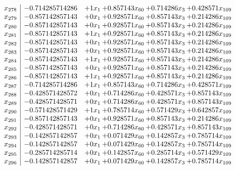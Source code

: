 \documentclass[11pt]{article}
\begin{document}
\[\begin{array}{c| c c@{\hskip 2pt} c@{\hskip 2pt} c@{\hskip 2pt} c@{\hskip 2pt} }
 x_{278}   &  -0.714285714286 & + 1 x_{1} & + 0.857143 x_{60} & + 0.714286 x_{3} & + 0.428571 x_{109}\\
 x_{279}   &  -0.857142857143 & + 0 x_{1} & + 0.928571 x_{60} & + 0.857143 x_{3} & + 0.214286 x_{109}\\
 x_{280}   &  -0.857142857143 & + 0 x_{1} & + 0.928571 x_{60} & + 0.857143 x_{3} & + 0.214286 x_{109}\\
 x_{281}   &  -0.857142857143 & + 1 x_{1} & + 0.928571 x_{60} & + 0.857143 x_{3} & + 0.214286 x_{109}\\
 x_{282}   &  -0.857142857143 & + 0 x_{1} & + 0.928571 x_{60} & + 0.857143 x_{3} & + 0.214286 x_{109}\\
 x_{283}   &  -0.857142857143 & + 0 x_{1} & + 0.928571 x_{60} & + 0.857143 x_{3} & + 0.214286 x_{109}\\
 x_{284}   &  -0.857142857143 & + 1 x_{1} & + 0.928571 x_{60} & + 0.857143 x_{3} & + 0.214286 x_{109}\\
 x_{285}   &  -0.857142857143 & + 0 x_{1} & + 0.928571 x_{60} & + 0.857143 x_{3} & + 0.214286 x_{109}\\
 x_{286}   &  -0.857142857143 & + 1 x_{1} & + 0.928571 x_{60} & + 0.857143 x_{3} & + 0.214286 x_{109}\\
 x_{287}   &  -0.714285714286 & + 1 x_{1} & + 0.857143 x_{60} & + 0.714286 x_{3} & + 0.428571 x_{109}\\
 x_{288}   &  -0.428571428572 & + 0 x_{1} & + 0.714286 x_{60} & + 0.428571 x_{3} & + 0.857143 x_{109}\\
 x_{289}   &  -0.428571428571 & + 0 x_{1} & + 0.714286 x_{60} & + 0.428571 x_{3} & + 0.857143 x_{109}\\
 x_{290}   &  -0.571428571429 & + 1 x_{1} & + 0.785714 x_{60} & + 0.571429 x_{3} & + 0.642857 x_{109}\\
 x_{291}   &  -0.857142857143 & + 0 x_{1} & + 0.928571 x_{60} & + 0.857143 x_{3} & + 0.214286 x_{109}\\
 x_{292}   &  -0.428571428571 & + 0 x_{1} & + 0.714286 x_{60} & + 0.428571 x_{3} & + 0.857143 x_{109}\\
 x_{293}   &  -0.142857142857 & + 0 x_{1} & + 0.071429 x_{60} & + 0.142857 x_{3} & + 0.785714 x_{109}\\
 x_{294}   &  -0.142857142857 & + 0 x_{1} & + 0.071429 x_{60} & + 0.142857 x_{3} & + 0.785714 x_{109}\\
 x_{295}   &  -0.285714285714 & + 0 x_{1} & + 0.142857 x_{60} & + 0.285714 x_{3} & + 0.571429 x_{109}\\
 x_{296}   &  -0.142857142857 & + 0 x_{1} & + 0.071429 x_{60} & + 0.142857 x_{3} & + 0.785714 x_{109}\\

\end{array}\]
\end{document}

